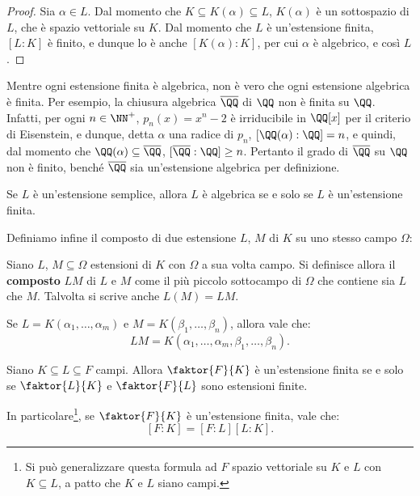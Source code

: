 \documentclass[12pt]{scrartcl}
\begin{document}
	\begin{proof}
		Sia $\alpha \in L$. Dal momento che $K \subseteq K(\alpha) \subseteq L$, $K(\alpha)$ è un sottospazio
		di $L$, che è spazio vettoriale su $K$. Dal momento
		che $L$ è un'estensione finita, $[L : K]$ è finito,
		e dunque lo è anche $[K(\alpha) : K]$, per cui
		$\alpha$ è algebrico, e così $L$.
	\end{proof}

	\begin{remark}
		Mentre ogni estensione finita è algebrica, non è
		vero che ogni estensione algebrica è finita. Per
		esempio,
		la chiusura algebrica $\overline{\QQ}$ di $\QQ$ non
		è finita su $\QQ$. Infatti, per ogni $n \in \NN^+$,
		$p_n(x) = x^n - 2$ è irriducibile in $\QQ[x]$ per il criterio
		di Eisenstein, e dunque, detta $\alpha$ una radice
		di $p_n$, $[\QQ(\alpha) : \QQ] = n$, e quindi, dal
		momento che $\QQ(\alpha) \subseteq \overline{\QQ}$,
		$[\overline{\QQ} : \QQ] \geq n$. Pertanto il grado
		di $\overline{\QQ}$ su $\QQ$ non è finito, benché
		$\overline{\QQ}$ sia un'estensione algebrica per
		definizione.
	\end{remark}

	\begin{remark}
		Se $L$ è un'estensione semplice, allora $L$
		è algebrica se e solo se $L$ è un'estensione
		finita.
	\end{remark}

	Definiamo infine il composto di due estensione $L$, $M$ di $K$ su uno stesso campo $\Omega$:

	\begin{definition}
		Siano $L$, $M \subseteq \Omega$ estensioni di $K$ con
		$\Omega$ a sua volta campo. Si definisce allora
		il \textbf{composto} $LM$ di $L$ e $M$ come il più
		piccolo sottocampo di $\Omega$ che contiene sia
		$L$ che $M$. Talvolta si scrive anche $L(M) = LM$.
	\end{definition}

	\begin{remark}
		Se $L = K(\alpha_1, \ldots, \alpha_m)$ e
		$M = K(\beta_1, \ldots, \beta_n)$, allora vale che:
		\[ LM = K(\alpha_1, \ldots, \alpha_m, \beta_1, \ldots, 
		\beta_n). \]
	\end{remark}
	
	\begin{theorem}
		Siano $K \subseteq L \subseteq F$ campi. Allora $\faktor{F}{K}$ è un'estensione finita se e solo se
		$\faktor{L}{K}$ e $\faktor{F}{L}$ sono estensioni finite. \medskip
		

		In particolare\footnote{Si può generalizzare questa formula ad $F$ spazio vettoriale su $K$ e $L$ con $K \subseteq L$, a patto che $K$ e $L$ siano campi.}, se $\faktor{F}{K}$ è un'estensione finita,
		vale che:
		\[ [F : K] = [F : L] [L : K]. \]
	\end{theorem}
	
\end{document}
